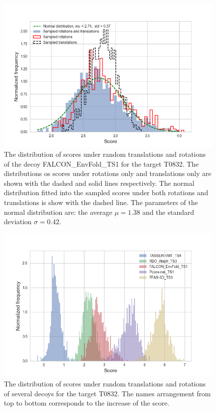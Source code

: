 \documentclass[letter,10pt]{article}
\begin{document}
\begin{figure}[H]
    \centering
    \includegraphics[width=\linewidth]{Fig/sampling_dist.png}
    \caption{The distribution of scores under random translations and rotations of the decoy 
    FALCON\_EnvFold\_TS1 for the target T0832. The distributions 
    os scores under rotations only and translations only are shown with the dashed and solid lines respectively.
    The normal distribution fitted into the sampled scores under both rotations and translations is show with the dashed line. 
    The parameters of the normal distribution are: the average $\mu = 1.38$ and the standard deviation $\sigma = 0.42$.}
    \label{Fig:ScoreDistribution}
\end{figure}

\begin{figure}[H]
    \centering
    \includegraphics[width=\linewidth]{Fig/decoys_sampling_dist.png}
    \caption{The distribution of scores under random translations and rotations of several decoys for the target T0832. The 
    names arrangement from top to bottom corresponds to the increase of the score.}
    \label{Fig:DecoysScoreDistribution}
\end{figure}
\end{document}

